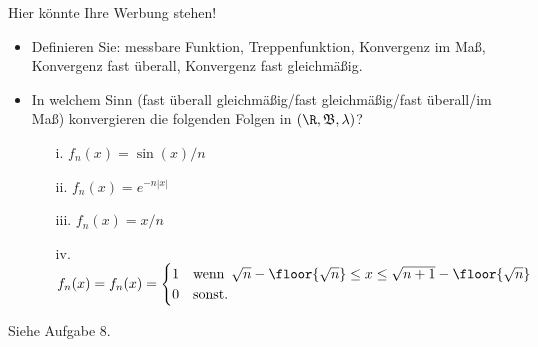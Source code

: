 \begin{exercise}

Hier könnte Ihre Werbung stehen!

\begin{itemize}
  \item Definieren Sie: messbare Funktion, Treppenfunktion, Konvergenz im Maß, Konvergenz fast überall, Konvergenz fast gleichmäßig.
  \item In welchem Sinn (fast überall gleichmäßig/fast gleichmäßig/fast überall/im Maß) konvergieren die folgenden Folgen in $(\R, \mathfrak{B}, \lambda)$?
  \begin{itemize}
    \item[i.] $f_n(x) = \sin(x)/n$
    \item[ii.] $f_n(x) = e^{-n |x|}$
    \item[iii.] $f_n(x) = x/n$
    \item[iv.] $f_n(x) = f_n(x) =
    \begin{cases}
      1 & \text{wenn} \enspace \sqrt{n} - \floor{\sqrt{n}} \leq x \leq \sqrt{n+1} - \floor{\sqrt{n}} \\
      0 & \text{sonst}.
    \end{cases}$
  \end{itemize}
\end{itemize}

\end{exercise}


\begin{solution}

Siehe Aufgabe 8.

\end{solution}
